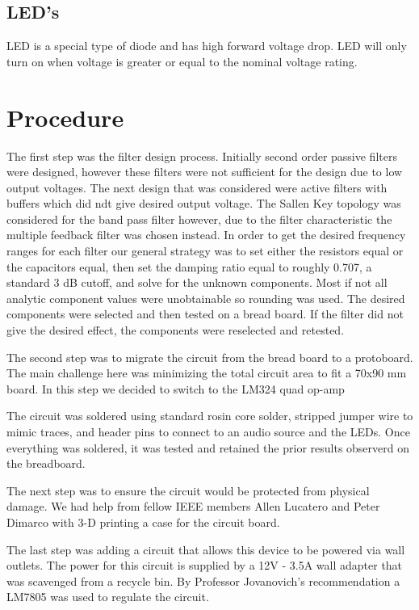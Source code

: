 \documentclass[12pt,a4paper]{article}
\begin{document}
{    \subsection*{\fontsize{10}{11}\selectfont LED's}
     LED is a special type of diode and has high forward voltage drop. LED will only turn on when voltage is greater or equal to the nominal voltage rating. 

    

    \section*{Procedure}

   The first step was the filter design process. Initially second order passive filters were designed, however these filters were not sufficient for the design due to low output voltages. The next design that was considered were active filters with buffers which did ndt give desired output voltage. The Sallen Key topology was considered for the band pass filter however, due to the filter characteristic the multiple feedback filter was chosen instead. In order to get the desired frequency ranges for each filter our general strategy was to set either the resistors equal or the capacitors equal,  then set the damping ratio equal to roughly 0.707, a standard 3 dB cutoff, and solve for the unknown components. Most if not all analytic component values were unobtainable so rounding was used. The desired components were selected and then tested on a bread board. If the filter did not give the desired effect, the components were reselected and retested.
  
 The second step was to migrate the circuit from the bread board to a protoboard. The main challenge here was  minimizing the total circuit area to fit a 70x90 mm board. In this step we decided to switch to the LM324 quad op-amp
  
 The circuit was soldered using standard rosin core solder, stripped jumper wire to mimic traces, and header pins to connect to an audio source and the LEDs. Once everything was soldered, it was tested and retained the prior results observerd on the breadboard.
  
 The next step was to ensure the circuit would be protected from physical damage. We had help from fellow IEEE members Allen Lucatero and Peter Dimarco with 3-D printing a case for the circuit board.
  
The last step was adding a circuit that allows this device to be powered via wall outlets. The power for this circuit is supplied by a 12V - 3.5A wall adapter that was scavenged from a recycle bin. By Professor Jovanovich's recommendation a LM7805 was used to regulate the circuit.
 
}
\end{document}
